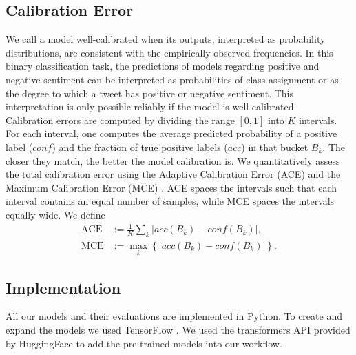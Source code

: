 \documentclass[10pt,conference,compsocconf]{IEEEtran}
\begin{document}
\subsection{Calibration Error}
We call a model well-calibrated when its outputs, interpreted as probability distributions, are consistent with the empirically observed frequencies.
In this binary classification task, the predictions of models regarding positive and negative sentiment can be interpreted as probabilities of class assignment or as the degree to which a tweet has positive or negative sentiment. This interpretation is only possible reliably if the model is well-calibrated.\\
Calibration errors are computed by dividing the range $[0,1]$ into $K$ intervals. For each interval, one computes the average predicted probability of a positive label ($\mathit{conf}$) and the fraction of true positive labels ($\mathit{acc}$) in that bucket $B_k$. The closer they match, the better the model calibration is.
We quantitatively assess the total calibration error using the Adaptive Calibration Error (ACE) \cite{nixon2020measuring} and the Maximum Calibration Error (MCE) \cite{guo2017calibration}. ACE spaces the intervals such that each interval contains an equal number of samples, while MCE spaces the intervals equally wide. We define
\begin{align}
    \mathrm{ACE} &:= \frac1K \sum_k |\mathit{acc}(B_k) - \mathit{conf}(B_k)|,\\
    \mathrm{MCE} &:= \max_k \left\{ |\mathit{acc}(B_k) - \mathit{conf}(B_k)| \right\}.
\end{align}

\subsection{Implementation}
All our models and their evaluations are implemented in Python. To create and expand the models we used TensorFlow \cite{abadi2016tensorflow}. We used the transformers API provided by HuggingFace \cite{wolf2020huggingfaces} to add the pre-trained models into our workflow. 
\end{document}

